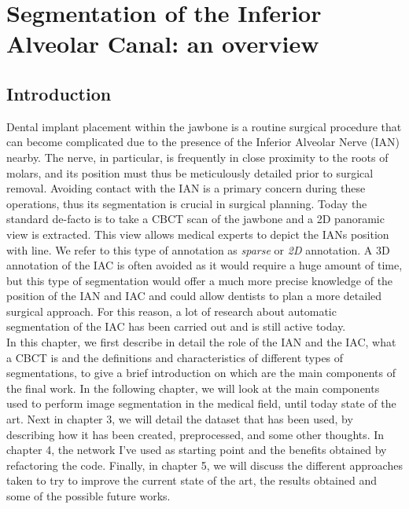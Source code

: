 
\chapter{Segmentation of the Inferior Alveolar Canal: an overview}

\label{chp:overview}

\def\:{\hskip0pt} %

\section{Introduction}
Dental implant placement within the jawbone is a routine surgical procedure that
can become complicated due to the presence of the Inferior Alveolar Nerve (IAN)
nearby. The nerve, in particular, is frequently in close proximity to the roots
of molars, and its position must thus be meticulously detailed prior to surgical
removal. Avoiding contact with the IAN is a primary concern during these
operations, thus its segmentation is crucial in surgical planning. Today the
standard de-facto is to take a CBCT scan of the jawbone and a 2D panoramic view
is extracted. This view allows medical experts to depict the IANs position with
line. We refer to this type of annotation as \emph{sparse} or \emph{2D}
annotation. A 3D annotation of the IAC is often avoided as it would require a
huge amount of time, but this type of segmentation would offer a much more
precise knowledge of the position of the IAN and IAC and could allow dentists to
plan a more detailed surgical approach. For this reason, a lot of research about
automatic segmentation of the IAC has been carried out and is still active
today.\\

In this chapter, we first describe in detail the role of the IAN and the IAC,
what a CBCT is and the definitions and characteristics of different types of
segmentations, to give a brief introduction on which are the main components of
the final work. In the following chapter, we will look at the main components
used to perform image segmentation in the medical field, until today state of
the art. Next in chapter 3, we will detail the dataset that has been used, by
describing how it has been created, preprocessed, and some other thoughts. In
chapter 4, the network I've used as starting point and the benefits obtained by
refactoring the code. Finally, in chapter 5, we will discuss the different
approaches taken to try to improve the current state of the art, the results
obtained and some of the possible future works.

